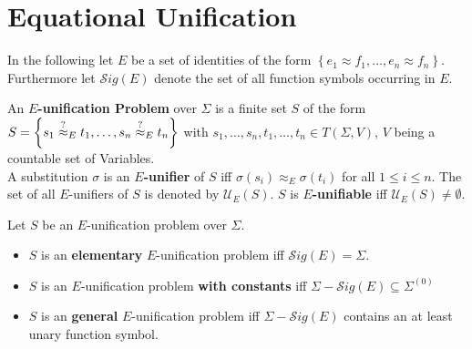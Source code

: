 \section{Equational Unification}
In the following let $E$ be a set of identities of the form $\left\lbrace  e_1\approx f_1,\dots,e_n\approx f_n \right\rbrace$. Furthermore let $\mathcal{S}ig(E)$ denote the set of all function symbols occurring in $E$. 
\begin{definition}
An \textbf{$E$-unification Problem} over $\Sigma$ is a finite set $S$ of the form $S=\left\lbrace s_1\stackrel{?}{\approx}_{E} t_1,\dots,s_n\stackrel{?}{\approx}_{E} t_n\right\rbrace $ with $s_1,\dots,s_n,t_1,\dots,t_n \in T(\Sigma,V)$, $V$ being a countable set of Variables.\\
A substitution $\sigma$ is an \textbf{$E$-unifier} of $S$ iff $ \sigma(s_i)\approx_E \sigma(t_i)$ for all $1\leq i \leq n$.
The set of all $E$-unifiers of $S$ is denoted by $\mathcal{U}_E(S)$. $S$ is \textbf{$E$-unifiable} iff $\mathcal{U}_E(S)\neq \emptyset$.
\end{definition}
\begin{definition}
Let $S$ be an $E$-unification problem over $\Sigma$.
\begin{itemize}
\item $S$ is an \textbf{elementary} $E$-unification problem iff $\mathcal{S}ig(E)=\Sigma$.
\item $S$ is an $E$-unification problem \textbf{with constants} iff $\Sigma-\mathcal{S}ig(E)\subseteq\Sigma^{(0)}$
\item $S$ is an \textbf{general} $E$-unification problem iff $\Sigma-\mathcal{S}ig(E)$ contains an at least unary function symbol.
\end{itemize}
\end{definition}